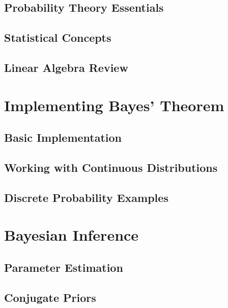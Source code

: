 \documentclass[
  letterpaper,
  paper=6in:9in,pagesize=pdftex,footinclude=on,11pt]{scrreprt}
\begin{document}
\chapter{Probability Theory
Essentials}\label{probability-theory-essentials}

\chapter{Statistical Concepts}\label{statistical-concepts}

\chapter{Linear Algebra Review}\label{linear-algebra-review}

\part{Implementing Bayes' Theorem}

\chapter{Basic Implementation}\label{basic-implementation}

\chapter{Working with Continuous
Distributions}\label{working-with-continuous-distributions}

\chapter{Discrete Probability
Examples}\label{discrete-probability-examples}

\part{Bayesian Inference}

\chapter{Parameter Estimation}\label{parameter-estimation}

\chapter{Conjugate Priors}\label{conjugate-priors}
\end{document}
